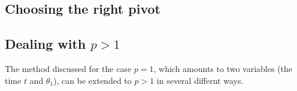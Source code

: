 \documentclass[]{article}
\begin{document}
\subsection{Choosing the right pivot}
\label{sec:pivot-choice}



\subsection{Dealing with $p > 1$}
\label{eq:pgt1}

The method discussed for the case $p = 1$, which amounts to 
two variables (the time $t$ and $\theta_1$), can be extended 
to $p > 1$ in several differnt ways. 



\end{document}
